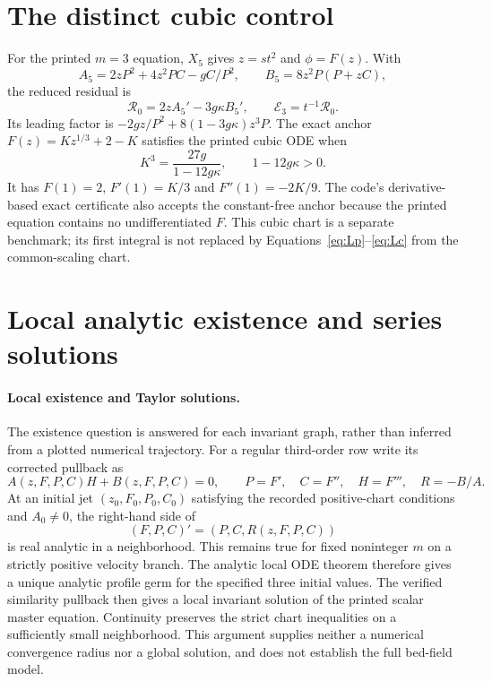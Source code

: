 \documentclass[12pt,a4paper,oneside]{report}
\numberwithin{equation}{chapter}
\newcommand{\R}{\mathcal R}
\newcommand{\E}{\mathcal E}
\begin{document}
\section{The distinct cubic control}
For the printed $m=3$ equation, $X_5$ gives $z=st^2$ and $\phi=F(z)$.
With
\begin{equation}
A_5=2zP^2+4z^2PC-gC/P^2,\qquad B_5=8z^2P(P+zC),
\end{equation}
the reduced residual is
\begin{equation}\label{eq:cubic}
\R_0=2zA_5'-3g\kappa B_5',\qquad \E_3=t^{-1}\R_0.
\end{equation}
Its leading factor is
$-2gz/P^2+8(1-3g\kappa)z^3P$. The exact anchor
$F(z)=Kz^{1/3}+2-K$ satisfies the printed cubic ODE when
\begin{equation}
K^3=\frac{27g}{1-12g\kappa},\qquad 1-12g\kappa>0.
\end{equation}
It has $F(1)=2$, $F'(1)=K/3$ and $F''(1)=-2K/9$.
The code's derivative-based exact certificate also accepts the constant-free
anchor because the printed equation contains no undifferentiated $F$.
This cubic chart is a separate benchmark; its first integral is not replaced
by Equations~\eqref{eq:Lp}--\eqref{eq:Lc} from the common-scaling chart.

\section{Local analytic existence and series solutions}
\paragraph{Local existence and Taylor solutions.}
The existence question is answered for each invariant graph, rather than
inferred from a plotted numerical trajectory. For a regular third-order row
write its corrected pullback as
\[
 A(z,F,P,C)H+B(z,F,P,C)=0,\qquad
 P=F',\quad C=F'',\quad H=F''',\quad R=-B/A.
\]
At an initial jet $(z_0,F_0,P_0,C_0)$ satisfying the recorded positive-chart
conditions and $A_0\ne0$, the right-hand side of
\[
 (F,P,C)'=(P,C,R(z,F,P,C))
\]
is real analytic in a neighborhood. This remains true for fixed noninteger
$m$ on a strictly positive velocity branch. The analytic local ODE theorem
\cite[Section~4.1]{teschl2012}
therefore gives a unique analytic profile germ for the specified three
initial values. The verified similarity pullback then gives a local invariant
solution of the printed scalar master equation. Continuity preserves the
strict chart inequalities on a sufficiently small neighborhood. This
argument supplies neither a numerical convergence radius nor a global
solution, and does not establish the full bed-field model.
\end{document}
